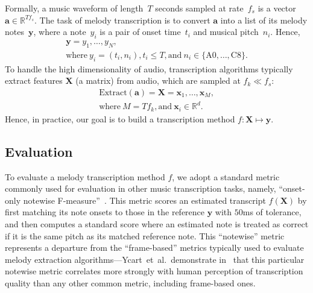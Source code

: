 Formally, a music waveform of length~$T$ seconds sampled at rate~$f_s$ is a vector~$\bm{a} \in \mathbb{R}^{Tf_s}$. The task of melody transcription is to convert $\bm{a}$ into a list of its melody notes~$\bm{y}$, where a note~$y_i$ is a pair of onset time~$t_i$ and musical pitch~$n_i$. Hence, 
\begin{gather*}
    \bm{y} = y_1, \ldots, y_N, \\
    \text{where}~y_i = (t_i, n_i), t_i \leq T, \text{and}~n_i \in \{\text{A0}, \ldots, \text{C8}\}.
\end{gather*}
To handle the high dimensionality of audio, transcription algorithms typically extract features $\bm{X}$ (a matrix) from audio, which are sampled at $f_k \ll f_s$:
\begin{gather*}
    \text{Extract}(\bm{a}) = \bm{X} = \bm{x}_1, \ldots, \bm{x}_M, \\ 
    \text{where}~M = Tf_k, \text{and}~\bm{x}_i \in \mathbb{R}^d.
\end{gather*}
Hence, in practice, our goal is to build a transcription method 
$f : \bm{X} \mapsto \bm{y}$.

\subsection{Evaluation}
\label{sec:eval}


To evaluate a melody transcription method $f$, 
we adopt a standard metric commonly used for evaluation in other music transcription tasks, namely,  ``onset-only notewise F-measure''~\cite{ycart2020investigating}. 
This metric scores an estimated transcript $f(\bm{X})$ by first matching its note onsets to those in the reference $\bm{y}$ with $50$ms of tolerance, and then computes a standard \fone{} score where an estimated note is treated as correct if it is the same pitch as its matched reference note. 
This ``notewise'' metric represents a departure from the ``frame-based'' metrics typically used to evaluate melody extraction algorithms---Ycart~et~al.\ demonstrate in~\cite{ycart2020investigating} that this particular notewise metric correlates more strongly with human perception of transcription quality than any other common metric, including frame-based ones.

